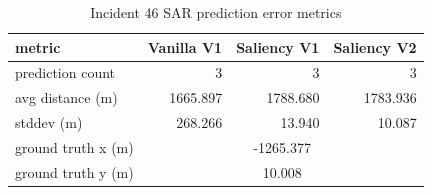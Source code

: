 \begin{table}[ht]
\centering
\caption{Incident 46 SAR prediction error metrics}
\label{tab:sar-incident-46}
\begin{tabular}{lrrr}
\hline
metric & Vanilla V1 & Saliency V1 & Saliency V2 \\
\hline
prediction count & 3 & 3 & 3 \\
avg distance (m) & 1665.897 & 1788.680 & 1783.936 \\
stddev (m) & 268.266 & 13.940 & 10.087 \\
ground truth x (m) & \multicolumn{3}{c}{-1265.377} \\
ground truth y (m) & \multicolumn{3}{c}{10.008} \\
\hline
\end{tabular}
\end{table}
